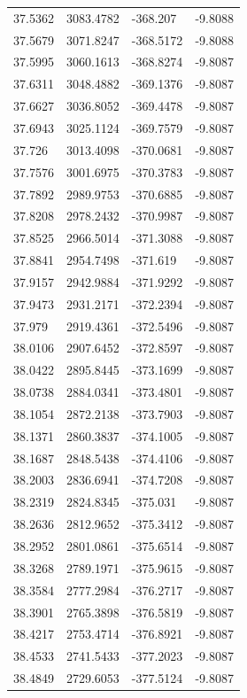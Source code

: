 \begin{table}[H]
\begin{tabular}{llll}
37.5362 & 3083.4782 & -368.207 & -9.8088 \\
37.5679 & 3071.8247 & -368.5172 & -9.8088 \\
37.5995 & 3060.1613 & -368.8274 & -9.8087 \\
37.6311 & 3048.4882 & -369.1376 & -9.8087 \\
37.6627 & 3036.8052 & -369.4478 & -9.8087 \\
37.6943 & 3025.1124 & -369.7579 & -9.8087 \\
37.726 & 3013.4098 & -370.0681 & -9.8087 \\
37.7576 & 3001.6975 & -370.3783 & -9.8087 \\
37.7892 & 2989.9753 & -370.6885 & -9.8087 \\
37.8208 & 2978.2432 & -370.9987 & -9.8087 \\
37.8525 & 2966.5014 & -371.3088 & -9.8087 \\
37.8841 & 2954.7498 & -371.619 & -9.8087 \\
37.9157 & 2942.9884 & -371.9292 & -9.8087 \\
37.9473 & 2931.2171 & -372.2394 & -9.8087 \\
37.979 & 2919.4361 & -372.5496 & -9.8087 \\
38.0106 & 2907.6452 & -372.8597 & -9.8087 \\
38.0422 & 2895.8445 & -373.1699 & -9.8087 \\
38.0738 & 2884.0341 & -373.4801 & -9.8087 \\
38.1054 & 2872.2138 & -373.7903 & -9.8087 \\
38.1371 & 2860.3837 & -374.1005 & -9.8087 \\
38.1687 & 2848.5438 & -374.4106 & -9.8087 \\
38.2003 & 2836.6941 & -374.7208 & -9.8087 \\
38.2319 & 2824.8345 & -375.031 & -9.8087 \\
38.2636 & 2812.9652 & -375.3412 & -9.8087 \\
38.2952 & 2801.0861 & -375.6514 & -9.8087 \\
38.3268 & 2789.1971 & -375.9615 & -9.8087 \\
38.3584 & 2777.2984 & -376.2717 & -9.8087 \\
38.3901 & 2765.3898 & -376.5819 & -9.8087 \\
38.4217 & 2753.4714 & -376.8921 & -9.8087 \\
38.4533 & 2741.5433 & -377.2023 & -9.8087 \\
38.4849 & 2729.6053 & -377.5124 & -9.8087 \\

\end{tabular}
\end{table}
